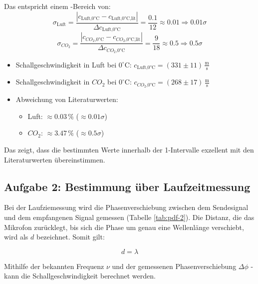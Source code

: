 \documentclass[12pt,a4paper,titlepage]{scrartcl}
\numberwithin{equation}{section}
\numberwithin{table}{section}
\numberwithin{figure}{section}
\begin{document}
Das entspricht einem \sigma-Bereich von:
\begin{equation}
    \sigma_\text{Luft} = \frac{|c_\text{Luft,0°C} - c_\text{Luft,0°C,lit}|}{\Delta c_\text{Luft,0°C}} = \frac{0.1}{12} \approx 0.01 \Rightarrow 0.01\sigma
\end{equation}
\begin{equation}
    \sigma_\text{$CO_2$} = \frac{|c_\text{$CO_2$,0°C} - c_\text{$CO_2$,0°C,lit}|}{\Delta c_\text{$CO_2$,0°C}} = \frac{9}{18} \approx 0.5 \Rightarrow 0.5\sigma
\end{equation} 

\begin{resultbox}
    \begin{itemize}
        \item Schallgeschwindigkeit in Luft bei $0^{\circ}\text{C}$: $c_\text{Luft,0°C} = (331\pm 11)\,\frac{\text{m}}{\text{s}}$
        \item Schallgeschwindigkeit in $CO_2$ bei $0^{\circ}\text{C}$: $c_\text{$CO_2$,0°C} = (268\pm 17)\,\frac{\text{m}}{\text{s}}$
        \item Abweichung von Literaturwerten:
        \begin{itemize}
            \item Luft: $\approx 0.03\,\%$ ($\approx 0.01\sigma$)
            \item $CO_2$: $\approx 3.47\,\%$ ($\approx 0.5\sigma$)
        \end{itemize}
    \end{itemize}
    Das zeigt, dass die bestimmten Werte innerhalb der 1\sigma-Intervalle exzellent mit den Literaturwerten übereinstimmen.
\end{resultbox}



\subsection{Aufgabe 2: Bestimmung über Laufzeitmessung}
Bei der Laufziemessung wird die Phasenverschiebung zwischen dem Sendesignal und dem empfangenen Signal gemessen (Tabelle \ref{tab:pdf-2}). Die Distanz, die das Mikrofon zurücklegt, bis sich die Phase um genau eine Wellenlänge verschiebt, wird als $d$ bezeichnet. Somit gilt:

\begin{equation}
    d = \lambda
\end{equation}

Mithilfe der bekannten Frequenz $\nu$ und der gemessenen Phasenverschiebung $\Delta \phi$ - kann die Schallgeschwindigkeit berechnet werden.
\end{document}
